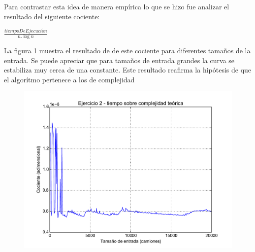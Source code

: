 \documentclass[11pt, a4paper, twoside]{article}
\begin{document}
Para contrastar esta idea de manera empírica lo que se hizo fue analizar el resultado del siguiente cociente: 

\begin{center}
$\frac{tiempoDeEjecuci\acute{o}n}{n. \log n}$
\end{center}

La figura \ref{fig:ej2-1} muestra el resultado de de este cociente para diferentes tamaños de la entrada.
Se puede apreciar que para tamaños de entrada grandes la curva se estabiliza muy cerca de una constante.
Este resultado reafirma la hipótesis de que el algorítmo pertenece a los de complejidad 




 

\begin{figure}[H]
   \begin{center}
   \includegraphics[width=1\textwidth,angle=0]{../ej2/graficos/test_2.pdf}
   \caption{}
   \label{fig:ej2-1}
   \end{center}
\end{figure}

\end{document}
